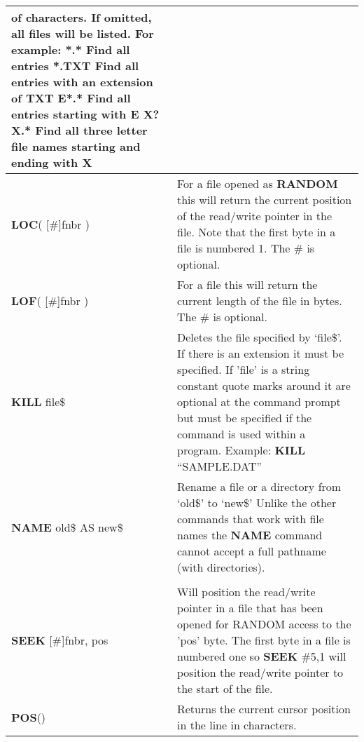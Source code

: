 \begin{table}[]
\begin{tabular}{|p{4cm}|p{10cm}|}
of characters. If omitted, all files will be listed. For example:\newline
*.* Find all entries\newline
*.TXT Find all entries with an extension of TXT\newline
E*.* Find all entries starting with E\newline
X?X.* Find all three letter file names starting and ending with X
\\ \hline
\textbf{LOC}( [\#]fnbr ) & For a file opened as \textbf{RANDOM} this will return the current position of the read/write pointer in the file. Note that the first byte in a file is
numbered 1. The \# is optional.
\\ \hline
\textbf{LOF}( [\#]fnbr ) & For a file this will return the current length of the file in bytes.
The \# is optional.
\\ \hline
\textbf{KILL} file\$ & Deletes the file specified by ‘file\$’. If there is an extension it must be
specified.\newline
If 'file' is a string constant quote marks around it are optional at the
command prompt but must be specified if the command is used within a
program. Example: \textbf{KILL} “SAMPLE.DAT”
\\ \hline
\textbf{NAME} old\$ AS new\$ 
& Rename a file or a directory from ‘old\$’ to ‘new\$’
Unlike the other commands that work with file names the \textbf{NAME}
command cannot accept a full pathname (with directories).
\\ \hline
\\ \hline
\textbf{SEEK} [\#]fnbr, pos & Will position the read/write pointer in a file that has been opened for RANDOM access to the 'pos' byte.\newline
The first byte in a file is numbered one so \textbf{SEEK} \#5,1 will position the read/write pointer to the start of the file.
\\ \hline
\textbf{POS}() & Returns the current cursor position in the line in characters.
\end{tabular}
\end{table}


